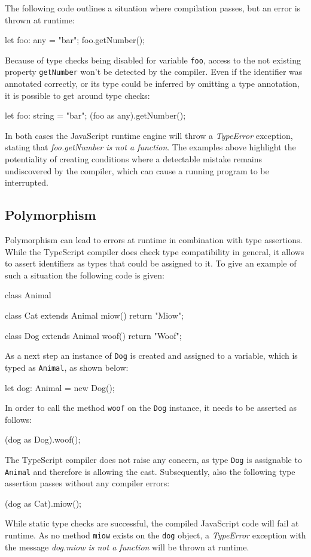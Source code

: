 \pagebreak
\noindent
The following code outlines a situation where compilation passes, but an error is thrown at runtime:
\begin{JsCode}[numbers=none]
let foo: any = "bar";
foo.getNumber();
\end{JsCode}
Because of type checks being disabled for variable \texttt{foo}, access to the not existing property \texttt{getNumber} won't be detected by the compiler. Even if the identifier was annotated correctly, or its type could be inferred by omitting a type annotation, it is possible to get around type checks:
\begin{JsCode}[numbers=none]
let foo: string = "bar";
(foo as any).getNumber();
\end{JsCode}
In both cases the JavaScript runtime engine will throw a \emph{TypeError} exception, stating that \emph{foo.getNumber is not a function}. The examples above highlight the potentiality of creating conditions where a detectable mistake remains undiscovered by the compiler, which can cause a running program to be interrupted.

\subsection{Polymorphism}

Polymorphism can lead to errors at runtime in combination with type assertions. While the TypeScript compiler does check type compatibility in general, it allows to assert identifiers as types that could be assigned to it. To give an example of such a situation the following code is given:
\begin{JsCode}[numbers=none]
class Animal { }

class Cat extends Animal {
  miow() {
    return "Miow";
  }
}

class Dog extends Animal {
  woof() {
    return "Woof";
  }
}
\end{JsCode}
As a next step an instance of \texttt{Dog} is created and assigned to a variable, which is typed as \texttt{Animal}, as shown below:
\begin{JsCode}[numbers=none]
let dog: Animal = new Dog();
\end{JsCode}
In order to call the method \texttt{woof} on the \texttt{Dog} instance, it needs to be asserted as follows:
\begin{JsCode}[numbers=none]
(dog as Dog).woof();
\end{JsCode}
The TypeScript compiler does not raise any concern, as type \texttt{Dog} is assignable to \texttt{Animal} and therefore is allowing the cast. Subsequently, also the following type assertion passes without any compiler errors:
\begin{JsCode}[numbers=none]
(dog as Cat).miow();
\end{JsCode}
While static type checks are successful, the compiled JavaScript code will fail at runtime. As no method \texttt{miow} exists on the \texttt{dog} object, a \emph{TypeError} exception with the message \emph{dog.miow is not a function} will be thrown at runtime.

